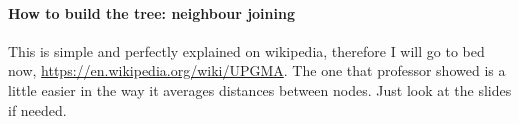 \paragraph{How to build the tree: neighbour joining}

This is simple and perfectly explained on wikipedia, therefore I will go to bed now,
\url{https://en.wikipedia.org/wiki/UPGMA}. The one that professor showed is a little easier in the way it
averages distances between nodes. Just look at the slides if needed.